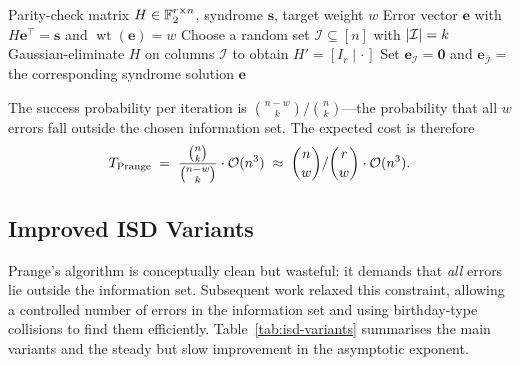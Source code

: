 \begin{algorithm}[t]
\caption{Prange's Information Set Decoding}
\label{alg:prange}
\begin{algorithmic}[1]
\Require Parity-check matrix $H \in \mathbb{F}_2^{r \times n}$, syndrome $\mathbf{s}$, target weight $w$
\Ensure Error vector $\mathbf{e}$ with $H\mathbf{e}^\top = \mathbf{s}$ and $\operatorname{wt}(\mathbf{e}) = w$
\Repeat
  \State Choose a random set $\mathcal{I} \subseteq [n]$ with $\left\lvert \mathcal{I} \right\rvert = k$ 
  \State Gaussian-eliminate $H$ on columns $\mathcal{I}$ to obtain $H' = [I_r \mid \cdot\,]$
  \State Set $\mathbf{e}_{\mathcal{I}} = \mathbf{0}$ and $\mathbf{e}_{\bar{\mathcal{I}}} = $ the corresponding syndrome solution
    \State \Return $\mathbf{e}$
  \EndIf
{}
\end{algorithmic}
\end{algorithm}

The success probability per iteration is $\binom{n-w}{k}/\binom{n}{k}$---the probability that all $w$ errors fall outside the chosen information set.  The expected cost is therefore
\begin{equation}
\label{eq:prange-cost}
T_{\mathrm{Prange}} \;=\; \frac{\binom{n}{k}}{\binom{n-w}{k}} \cdot \mathcal{O}(n^3) \;\approx\; \binom{n}{w} / \binom{r}{w} \cdot \mathcal{O}(n^3).
\end{equation}


\subsection{Improved ISD Variants}
\label{subsec:isd-variants}

Prange's algorithm is conceptually clean but wasteful: it demands that \emph{all} errors lie outside the information set.  Subsequent work relaxed this constraint, allowing a controlled number of errors in the information set and using birthday-type collisions to find them efficiently.  Table~\ref{tab:isd-variants} summarises the main variants and the steady but slow improvement in the asymptotic exponent.

